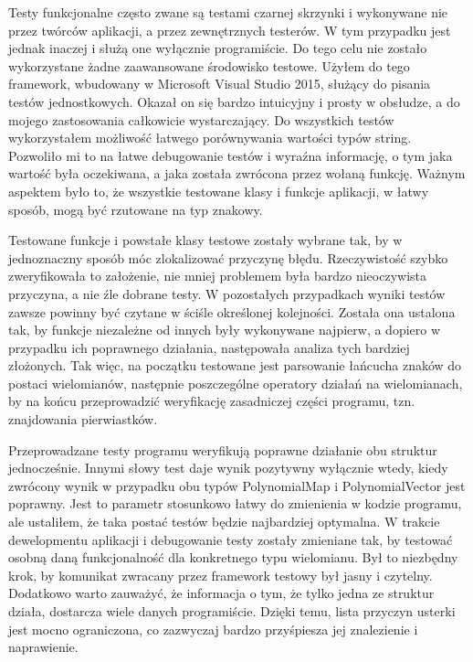 \documentclass[twoside,a4paper]{book}
\begin{document}
Testy funkcjonalne często zwane są testami czarnej skrzynki i wykonywane nie przez twórców aplikacji, a przez zewnętrznych testerów. W tym przypadku jest jednak inaczej i służą one wyłącznie programiście. Do tego celu nie zostało wykorzystane żadne zaawansowane środowisko testowe. Użyłem do tego framework, wbudowany w Microsoft Visual Studio 2015, służący do pisania testów jednostkowych. Okazał on się bardzo intuicyjny i prosty w obsłudze, a do mojego zastosowania całkowicie wystarczający. Do wszystkich testów wykorzystałem możliwość łatwego porównywania wartości typów string. Pozwoliło mi to na łatwe debugowanie testów i wyraźna informację, o tym jaka wartość była oczekiwana, a jaka została zwrócona przez wołaną funkcję. Ważnym aspektem było to, że wszystkie testowane klasy i funkcje aplikacji, w łatwy sposób, mogą być rzutowane na typ znakowy.

Testowane funkcje i powstałe klasy testowe zostały wybrane tak, by w jednoznaczny sposób móc zlokalizować przyczynę błędu. Rzeczywistość szybko zweryfikowała to założenie, nie mniej problemem była bardzo nieoczywista przyczyna, a nie źle dobrane testy. W pozostałych przypadkach wyniki testów zawsze powinny być czytane w ściśle określonej kolejności. Została ona ustalona tak, by funkcje niezależne od innych były wykonywane najpierw, a dopiero w przypadku ich poprawnego działania, następowała analiza tych bardziej złożonych. Tak więc, na początku testowane jest parsowanie łańcucha znaków do postaci wielomianów, następnie poszczególne operatory działań na wielomianach, by na końcu przeprowadzić weryfikację zasadniczej części programu, tzn. znajdowania pierwiastków.

Przeprowadzane testy programu weryfikują poprawne działanie obu struktur jednocześnie. Innymi słowy test daje wynik pozytywny wyłącznie wtedy, kiedy zwrócony wynik w przypadku obu typów PolynomialMap i PolynomialVector jest poprawny. Jest to parametr stosunkowo łatwy do zmienienia w kodzie programu, ale ustaliłem, że taka postać testów będzie najbardziej optymalna. W trakcie dewelopmentu aplikacji i debugowanie testy zostały zmieniane tak, by testować osobną daną funkcjonalność dla konkretnego typu wielomianu. Był to niezbędny krok, by komunikat zwracany przez framework testowy był jasny i czytelny. Dodatkowo warto zauważyć, że informacja o tym, że tylko jedna ze struktur działa, dostarcza wiele danych programiście. Dzięki temu, lista przyczyn usterki jest mocno ograniczona, co zazwyczaj bardzo przyśpiesza jej znalezienie i naprawienie.
\end{document}
